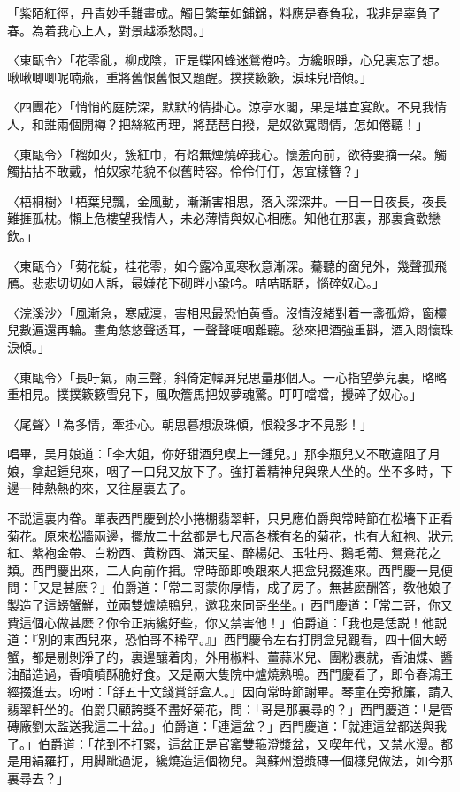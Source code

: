 「紫陌紅徑，丹青妙手難畫成。觸目繁華如鋪錦，料應是春負我，我非是辜負了春。為着我心上人，對景越添愁悶。」

〈東甌令〉「花零亂，柳成陰，正是蝶困蜂迷鶯倦吟。方纔眼睜，心兒裏忘了想。啾啾唧唧呢喃燕，重將舊恨舊恨又題醒。撲撲簌簌，淚珠兒暗傾。」

〈四團花〉「悄悄的庭院深，默默的情掛心。涼亭水閣，果是堪宜宴飲。不見我情人，和誰兩個開樽？把絲絃再理，將琵琶自撥，是奴欲寬悶情，怎如倦聽！」

〈東甌令〉「榴如火，簇紅巾，有焰無煙燒碎我心。懷羞向前，欲待要摘一朶。觸觸拈拈不敢戴，怕奴家花貌不似舊時容。伶伶仃仃，怎宜樣簪？」

〈梧桐樹〉「梧葉兒飄，金風動，漸漸害相思，落入深深井。一日一日夜長，夜長難捱孤枕。懶上危樓望我情人，未必薄情與奴心相應。知他在那裏，那裏貪歡戀飲。」

〈東甌令〉「菊花綻，桂花零，如今露冷風寒秋意漸深。驀聽的窗兒外，幾聲孤飛鴈。悲悲切切如人訴，最嫌花下砌畔小蛩吟。咭咭聒聒，惱碎奴心。」

〈浣溪沙〉「風漸急，寒威澟，害相思最恐怕黄昏。沒情沒緒對着一盞孤燈，窗欞兒數遍還再輪。畫角悠悠聲透耳，一聲聲哽咽難聽。愁來把酒強重斟，酒入悶懷珠淚傾。」

〈東甌令〉「長吁氣，兩三聲，斜倚定幃屏兒思量那個人。一心指望夢兒裏，略略重相見。撲撲簌簌雪兒下，風吹簷馬把奴夢魂驚。叮叮噹噹，攪碎了奴心。」

〈尾聲〉「為多情，牽掛心。朝思暮想淚珠傾，恨殺多才不見影！」

唱畢，吴月娘道：「李大姐，你好甜酒兒喫上一鍾兒。」那李瓶兒又不敢違阻了月娘，拿起鍾兒來，咽了一口兒又放下了。強打着精神兒與衆人坐的。坐不多時，下邊一陣熱熱的來，又往屋裏去了。

不説這裏内眷。單表西門慶到於小捲棚翡翠軒，只見應伯爵與常時節在松墻下正看菊花。原來松牆兩邊，擺放二十盆都是七尺高各樣有名的菊花，也有大紅袍、狀元紅、紫袍金帶、白粉西、黄粉西、滿天星、醉楊妃、玉牡丹、鵝毛葡、鴛鴦花之類。西門慶出來，二人向前作揖。常時節即喚跟來人把盒兒掇進來。西門慶一見便問：「又是甚麽？」伯爵道：「常二哥蒙你厚情，成了房子。無甚麽酬答，敎他娘子製造了這螃蟹鮮，並兩雙爐燒鴨兒，邀我來同哥坐坐。」西門慶道：「常二哥，你又費這個心做甚麽？你令正病纔好些，你又禁害他！」伯爵道：「我也是恁説！他説道：『別的東西兒來，恐怕哥不稀罕。』」西門慶令左右打開盒兒觀看，四十個大螃蟹，都是剔剝淨了的，裏邊釀着肉，外用椒料、薑蒜米兒、團粉裹就，香油煠、醬油醋造過，香噴噴酥脆好食。又是兩大隻院中爐燒熟鴨。西門慶看了，即令春鴻王經掇進去。吩咐：「㧱五十文錢賞㧱盒人。」因向常時節謝畢。琴童在旁掀簾，請入翡翠軒坐的。伯爵只顧誇獎不盡好菊花，問：「哥是那裏尋的？」西門慶道：「是管磚廠劉太監送我這二十盆。」伯爵道：「連這盆？」西門慶道：「就連這盆都送與我了。」伯爵道：「花到不打緊，這盆正是官窰雙箍澄漿盆，又喫年代，又禁水漫。都是用絹羅打，用脚跐過泥，纔燒造這個物兒。與蘇州澄漿磚一個樣兒做法，如今那裏尋去？」

